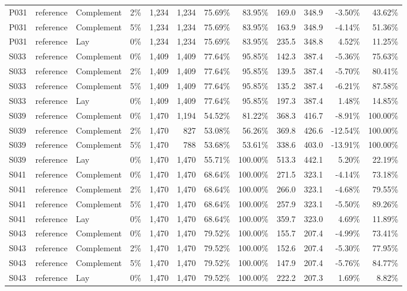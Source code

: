 \begin{longtable}{llllrrrrrrrr}
P031 & reference & Complement & 2\% & 1,234 & 1,234 & 75.69\% & 83.95\% & 169.0 & 348.9 & -3.50\% & 43.62\% \\
P031 & reference & Complement & 5\% & 1,234 & 1,234 & 75.69\% & 83.95\% & 163.9 & 348.9 & -4.14\% & 51.36\% \\
P031 & reference & Lay & 0\% & 1,234 & 1,234 & 75.69\% & 83.95\% & 235.5 & 348.8 & 4.52\% & 11.25\% \\
S033 & reference & Complement & 0\% & 1,409 & 1,409 & 77.64\% & 95.85\% & 142.3 & 387.4 & -5.36\% & 75.63\% \\
S033 & reference & Complement & 2\% & 1,409 & 1,409 & 77.64\% & 95.85\% & 139.5 & 387.4 & -5.70\% & 80.41\% \\
S033 & reference & Complement & 5\% & 1,409 & 1,409 & 77.64\% & 95.85\% & 135.2 & 387.4 & -6.21\% & 87.58\% \\
S033 & reference & Lay & 0\% & 1,409 & 1,409 & 77.64\% & 95.85\% & 197.3 & 387.4 & 1.48\% & 14.85\% \\
S039 & reference & Complement & 0\% & 1,470 & 1,194 & 54.52\% & 81.22\% & 368.3 & 416.7 & -8.91\% & 100.00\% \\
S039 & reference & Complement & 2\% & 1,470 & 827 & 53.08\% & 56.26\% & 369.8 & 426.6 & -12.54\% & 100.00\% \\
S039 & reference & Complement & 5\% & 1,470 & 788 & 53.68\% & 53.61\% & 338.6 & 403.0 & -13.91\% & 100.00\% \\
S039 & reference & Lay & 0\% & 1,470 & 1,470 & 55.71\% & 100.00\% & 513.3 & 442.1 & 5.20\% & 22.19\% \\
S041 & reference & Complement & 0\% & 1,470 & 1,470 & 68.64\% & 100.00\% & 271.5 & 323.1 & -4.14\% & 73.18\% \\
S041 & reference & Complement & 2\% & 1,470 & 1,470 & 68.64\% & 100.00\% & 266.0 & 323.1 & -4.68\% & 79.55\% \\
S041 & reference & Complement & 5\% & 1,470 & 1,470 & 68.64\% & 100.00\% & 257.9 & 323.1 & -5.50\% & 89.26\% \\
S041 & reference & Lay & 0\% & 1,470 & 1,470 & 68.64\% & 100.00\% & 359.7 & 323.0 & 4.69\% & 11.89\% \\
S043 & reference & Complement & 0\% & 1,470 & 1,470 & 79.52\% & 100.00\% & 155.7 & 207.4 & -4.99\% & 73.41\% \\
S043 & reference & Complement & 2\% & 1,470 & 1,470 & 79.52\% & 100.00\% & 152.6 & 207.4 & -5.30\% & 77.95\% \\
S043 & reference & Complement & 5\% & 1,470 & 1,470 & 79.52\% & 100.00\% & 147.9 & 207.4 & -5.76\% & 84.77\% \\
S043 & reference & Lay & 0\% & 1,470 & 1,470 & 79.52\% & 100.00\% & 222.2 & 207.3 & 1.69\% & 8.82\% \\
\end{longtable}
